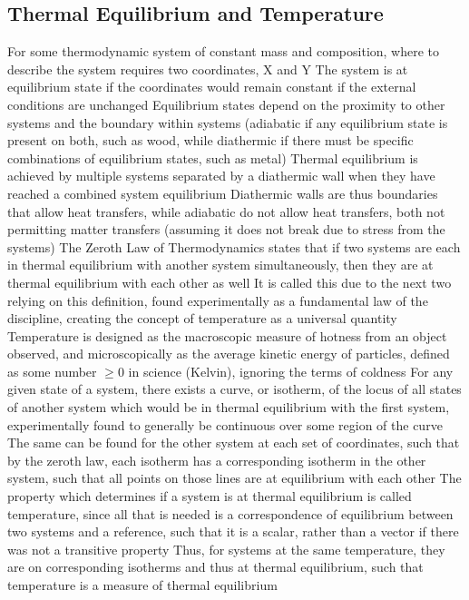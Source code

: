 \documentclass[11 pt, twoside]{article}
\newenvironment{outline*}
{
	\begin{outline}[enumerate]
	}
	{\end{outline}
}
\begin{document}
\subsection{Thermal Equilibrium and Temperature}
\begin{outline*}
\1 For some thermodynamic system of constant mass and composition, where to describe the system requires two coordinates, X and Y
\2 The system is at equilibrium state if the coordinates would remain constant if the external conditions are unchanged
\2 Equilibrium states depend on the proximity to other systems and the boundary within systems (adiabatic if any equilibrium state is present on both, such as wood, while diathermic if there must be specific combinations of equilibrium states, such as metal)
\3 Thermal equilibrium is achieved by multiple systems separated by a diathermic wall when they have reached a combined system equilibrium
\3 Diathermic walls are thus boundaries that allow heat transfers, while adiabatic do not allow heat transfers, both not permitting matter transfers (assuming it does not break due to stress from the systems)
\2 The Zeroth Law of Thermodynamics states that if two systems are each in thermal equilibrium with another system simultaneously, then they are at thermal equilibrium with each other as well
\3 It is called this due to the next two relying on this definition, found experimentally as a fundamental law of the discipline, creating the concept of temperature as a universal quantity
\1 Temperature is designed as the macroscopic measure of hotness from an object observed, and microscopically as the average kinetic energy of particles, defined as some number $\geq 0$ in science (Kelvin), ignoring the terms of coldness
\2 For any given state of a system, there exists a curve, or isotherm, of the locus of all states of another system which would be in thermal equilibrium with the first system, experimentally found to generally be continuous over some region of the curve
\3 The same can be found for the other system at each set of coordinates, such that by the zeroth law, each isotherm has a corresponding isotherm in the other system, such that all points on those lines are at equilibrium with each other
\3 The property which determines if a system is at thermal equilibrium is called temperature, since all that is needed is a correspondence of equilibrium between two systems and a reference, such that it is a scalar, rather than a vector if there was not a transitive property
\2 Thus, for systems at the same temperature, they are on corresponding isotherms and thus at thermal equilibrium, such that temperature is a measure of thermal equilibrium

\end{outline*}
\end{document}
